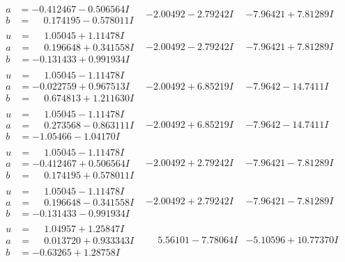 \documentclass[1p]{elsarticle_modified}
\theoremstyle{definition}
\begin{document}
$$\begin{array}{c|c|c}
\begin{aligned}
a &= -0.412467 - 0.506564 I \\
b &= \phantom{-}0.174195 - 0.578011 I\end{aligned}
 & -2.00492 - 2.79242 I & -7.96421 + 7.81289 I \\ \hline\begin{aligned}
u &= \phantom{-}1.05045 + 1.11478 I \\
a &= \phantom{-}0.196648 + 0.341558 I \\
b &= -0.131433 + 0.991934 I\end{aligned}
 & -2.00492 - 2.79242 I & -7.96421 + 7.81289 I \\ \hline\begin{aligned}
u &= \phantom{-}1.05045 - 1.11478 I \\
a &= -0.022759 + 0.967513 I \\
b &= \phantom{-}0.674813 + 1.211630 I\end{aligned}
 & -2.00492 + 6.85219 I & -7.9642 - 14.7411 I \\ \hline\begin{aligned}
u &= \phantom{-}1.05045 - 1.11478 I \\
a &= \phantom{-}0.273568 - 0.863111 I \\
b &= -1.05466 - 1.04170 I\end{aligned}
 & -2.00492 + 6.85219 I & -7.9642 - 14.7411 I \\ \hline\begin{aligned}
u &= \phantom{-}1.05045 - 1.11478 I \\
a &= -0.412467 + 0.506564 I \\
b &= \phantom{-}0.174195 + 0.578011 I\end{aligned}
 & -2.00492 + 2.79242 I & -7.96421 - 7.81289 I \\ \hline\begin{aligned}
u &= \phantom{-}1.05045 - 1.11478 I \\
a &= \phantom{-}0.196648 - 0.341558 I \\
b &= -0.131433 - 0.991934 I\end{aligned}
 & -2.00492 + 2.79242 I & -7.96421 - 7.81289 I \\ \hline\begin{aligned}
u &= \phantom{-}1.04957 + 1.25847 I \\
a &= \phantom{-}0.013720 + 0.933343 I \\
b &= -0.63265 + 1.28758 I\end{aligned}
 & \phantom{-}5.56101 - 7.78064 I & -5.10596 + 10.77370 I \\ \hline\begin{aligned}

\end{aligned}
\end{array}$$
\end{document}
